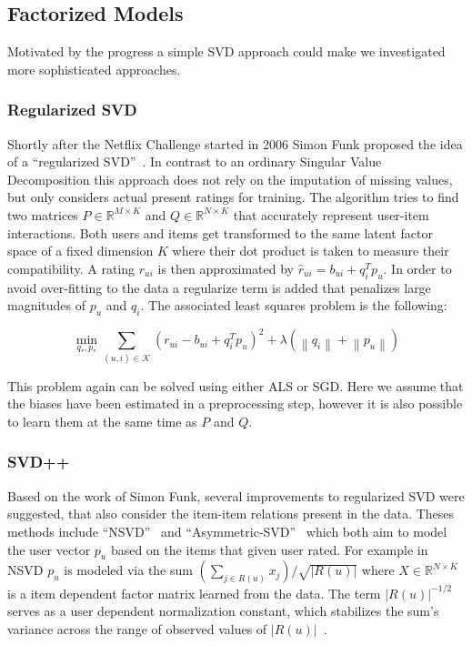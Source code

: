 \documentclass[10pt,conference,compsocconf]{IEEEtran}
\newcommand{\abs}[1]{\left\lvert#1\right\rvert}
\newcommand{\norm}[1]{\left\lVert#1\right\rVert}
\begin{document}
\subsection{Factorized Models}
\label{sub:factorized_models}

Motivated by the progress a simple SVD approach could make we investigated more
sophisticated approaches.

\subsubsection{Regularized SVD}
\label{ssub:regularized_svd}

Shortly after the Netflix Challenge started in 2006 Simon Funk proposed the idea
of a ``regularized SVD''~\cite{funk2006netflix}. In contrast to an ordinary
Singular Value Decomposition this approach does not rely on the imputation of
missing values, but only considers actual present ratings for training. The
algorithm tries to find two matrices $P \in \mathbb R^{M \times K}$ and $Q \in
\mathbb R^{N \times K}$ that accurately represent user-item interactions. Both
users and items get transformed to the same latent factor space of a fixed
dimension $K$ where their dot product is taken to measure their compatibility. A
rating $r_{ui}$ is then approximated by $\hat{r}_{ui} = b_{ui} + q_i^{T}p_u$. In
order to avoid over-fitting to the data a regularize term is added that
penalizes large magnitudes of $p_u$ and $q_i$. The associated least squares
problem is the following:

\begin{equation}
  \min_{q_*,p_*} \sum_{(u,i) \in \mathcal K} {(r_{ui} - b_{ui} + q_i^T p_u)}^2 +
  \lambda (\norm{q_i} + \norm{p_u})
\end{equation}

This problem again can be solved using either ALS or SGD\@. Here we assume that
the biases have been estimated in a preprocessing step, however it is also
possible to learn them at the same time as $P$ and $Q$.

\subsubsection{SVD++}
\label{ssub:SVDpp}

Based on the work of Simon Funk, several improvements to regularized SVD were
suggested, that also consider the item-item relations present in the data.
Theses methods include ``NSVD''~\cite{paterek2007improving} and
``Asymmetric-SVD''~\cite{koren2008factorization} which both aim to model the
user vector $p_u$ based on the items that given user rated. For example in NSVD
$p_u$ is modeled via the sum $\left( \sum_{j \in R(u)} x_j \right ) /
\sqrt{\abs{R(u)}}$ where $X \in \mathbb R^{N \times K}$ is a item dependent
factor matrix learned from the data. The term $\abs{R(u)}^{-1/2}$ serves as a
user dependent normalization constant, which stabilizes the sum's variance
across the range of observed values of $\abs{R(u)}$~\cite{koren2011advances}.
\end{document}
